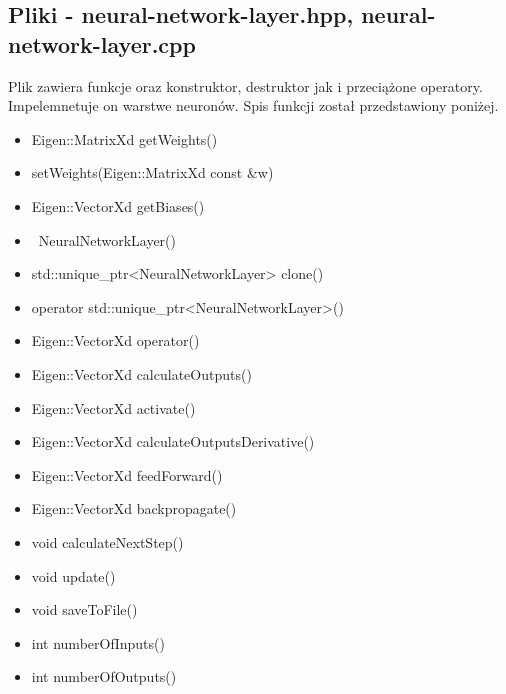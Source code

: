 \documentclass{classrep}
\begin{document}
{        \subsection{Pliki - neural-network-layer.hpp, neural-network-layer.cpp}
        {
            Plik zawiera funkcje oraz konstruktor, destruktor jak i przeciążone operatory.
            Impelemnetuje on warstwe neuronów.
            Spis funkcji został przedstawiony poniżej.
            \begin{itemize}
                \item Eigen::MatrixXd getWeights()
                \item setWeights(Eigen::MatrixXd const \&w)
                \item Eigen::VectorXd getBiases()
                \item ~NeuralNetworkLayer()
                \item std::unique\_ptr<NeuralNetworkLayer> clone()
                \item operator std::unique\_ptr<NeuralNetworkLayer>()
                \item Eigen::VectorXd operator()
                \item Eigen::VectorXd calculateOutputs()
                \item Eigen::VectorXd activate()
                \item Eigen::VectorXd calculateOutputsDerivative()
                \item Eigen::VectorXd feedForward()
                \item Eigen::VectorXd backpropagate()
                \item void calculateNextStep()
                \item void update()
                \item void saveToFile()
                \item int numberOfInputs()
                \item int numberOfOutputs()
            \end{itemize}
        }

}
\end{document}
